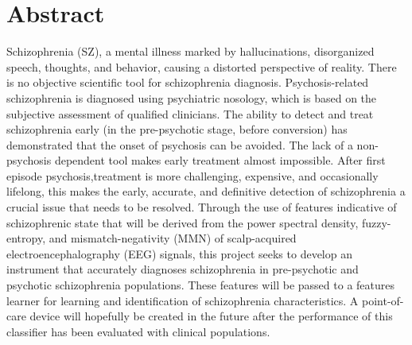 \chapter*{ \textbf{\Large \sc Abstract}}
\vspace{50pt}
Schizophrenia (SZ), a mental illness marked by hallucinations, disorganized speech, thoughts, and behavior, causing a distorted perspective of reality. There is no objective scientific tool for schizophrenia diagnosis. Psychosis-related schizophrenia is diagnosed using psychiatric nosology, which is based on the subjective assessment of qualified clinicians. The ability to detect and treat schizophrenia early (in the pre-psychotic stage, before conversion) has demonstrated that the onset of psychosis can be avoided. The lack of a non-psychosis dependent tool makes early treatment almost impossible. After first episode psychosis,treatment is more challenging, expensive, and occasionally lifelong, this makes the early, accurate, and definitive detection of schizophrenia a crucial issue that needs to be resolved. Through the use of features indicative of schizophrenic state that will be derived from the power spectral density, fuzzy-entropy, and mismatch-negativity (MMN) of scalp-acquired electroencephalography (EEG) signals, this project seeks to develop an instrument that accurately diagnoses schizophrenia in pre-psychotic and psychotic schizophrenia populations. These features will be passed to a features learner for learning and identification of schizophrenia characteristics. A point-of-care device will hopefully be created in the future after the performance of this classifier has been evaluated with clinical populations.
